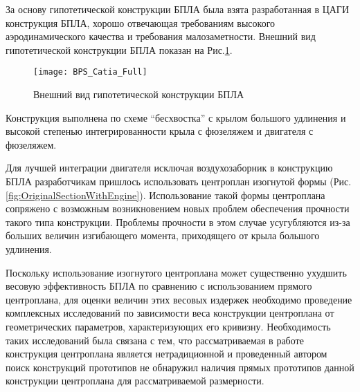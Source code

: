 





За основу гипотетической конструкции БПЛА была взята разработанная в ЦАГИ конструкция БПЛА, хорошо отвечающая требованиям высокого аэродинамического качества и требования малозаметности. Внешний вид гипотетической конструкции БПЛА показан на Рис.\ref{fig:BPLA_TSAGI}.
 

  
  



\begin{figure}[ht]
\centering
\texttt{[image: BPS\_Catia\_Full]}
\caption{Внешний вид гипотетической конструкции БПЛА}
\label{fig:BPLA_TSAGI}
\end{figure}

Конструкция выполнена по схеме ``бесхвостка'' с крылом большого удлинения и высокой степенью интегрированности крыла с фюзеляжем и двигателя с фюзеляжем. 

Для лучшей интеграции двигателя исключая воздухозаборник в конструкцию БПЛА разработчикам пришлось использовать центроплан изогнутой формы (Рис.\ref{fig:OriginalSectionWithEngine}). Использование такой формы центроплана сопряжено с возможным возникновением новых проблем обеспечения прочности такого типа конструкции. Проблемы прочности в этом случае усугубляются из-за больших величин изгибающего момента, приходящего от крыла большого удлинения. 

Поскольку использование изогнутого центроплана может существенно ухудшить весовую эффективность БПЛА по сравнению с использованием прямого центроплана, для оценки величин этих весовых издержек необходимо проведение комплексных исследований по зависимости веса конструкции центроплана от геометрических параметров, характеризующих его кривизну. 
Необходимость таких исследований была связана с тем, что рассматриваемая в работе конструкция центроплана является нетрадиционной и проведенный автором поиск конструкций прототипов не обнаружил наличия прямых прототипов данной конструкции центроплана для рассматриваемой размерности.

